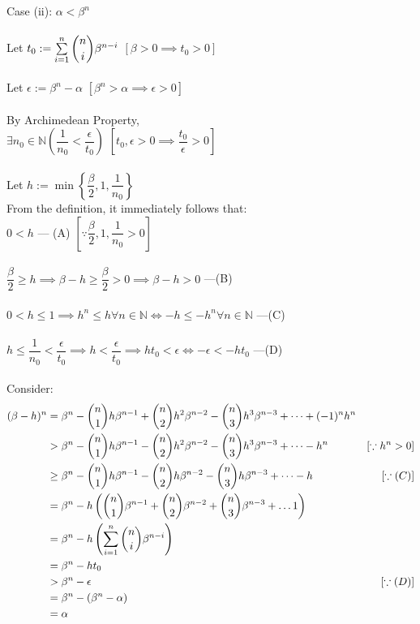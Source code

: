 Case (ii): $\alpha < \beta^n$\\~\\
Let $t_0 := \sum\limits_{i=1}^{n}\dbinom{n}{i}\beta^{n-i}$ \hfill $[\beta > 0 \implies t_0 > 0]$\\~\\
Let $\epsilon := \beta^n - \alpha$ \hfill $[\beta^n > \alpha \implies \epsilon > 0]$\\~\\
By Archimedean Property, \\
$\exists n_0 \in \mathbb{N}\left(\dfrac{1}{n_0} < \dfrac{\epsilon}{t_0}\right)$ \hfill $\left[t_0, \epsilon > 0 \implies \dfrac{t_0}{\epsilon} > 0\right]$\\~\\
Let $h:= \min\left\{\dfrac{\beta}{2}, 1, \dfrac{1}{n_0}\right\}$\\
From the definition, it immediately follows that:\\
$0 < h $ --- (A) \hfill $\left[\because \dfrac{\beta}{2}, 1, \dfrac{1}{n_0} > 0\right]$\\~\\
$\dfrac{\beta}{2} \ge h\implies \beta - h \ge \dfrac{\beta}{2} > 0 \implies \beta - h > 0$ ---(B) \\ ~ \\
$0 < h \le 1 \implies h^n \le h \forall n \in \mathbb{N} \iff -h \le -h^n \forall n \in \mathbb{N}$ ---(C)\\ ~ \\
$h \le \dfrac{1}{n_0} < \dfrac{\epsilon}{t_0} \implies h < \dfrac{\epsilon}{t_0} \implies ht_0 < \epsilon \iff -\epsilon < -ht_0$ ---(D)\\~\\
Consider:
\begin{align*}
	(\beta - h) ^n &= \beta^n - \dbinom{n}{1}h\beta^{n-1} + \dbinom{n}{2}h^2\beta^{n-2} - \dbinom{n}{3}h^3\beta^{n-3} +\dots +(-1)^nh^n&\\
& >  \beta^n - \dbinom{n}{1}h\beta^{n-1} - \dbinom{n}{2}h^2\beta^{n-2} - \dbinom{n}{3}h^3\beta^{n-3} +\dots -h^n & [\because h^n > 0] \\
& \ge \beta^n - \dbinom{n}{1}h\beta^{n-1} - \dbinom{n}{2}h\beta^{n-2} - \dbinom{n}{3}h\beta^{n-3} +\dots -h& [\because (C)]\\
& = \beta^n - h\left(\dbinom{n}{1}\beta^{n-1} + \dbinom{n}{2}\beta^{n-2} + \dbinom{n}{3}\beta^{n-3} +\dots 1\right) &\\
& = \beta^n - h\left( \sum\limits_{i=1}^{n}\dbinom{n}{i}\beta^{n-i} \right) &\\
& = \beta^n -  ht_0&\\
& > \beta^n - \epsilon & [\because (D)]\\
& = \beta^n - (\beta^n - \alpha) &\\
& = \alpha &\\
\end{align*}
